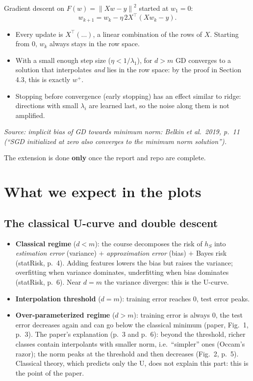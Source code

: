 \documentclass[11pt,a4paper]{article}
\newcommand{\norm}[1]{\left\lVert #1 \right\rVert}
\newcommand{\fonte}[1]{\par\noindent\textit{Source: #1}\par\smallskip}
\begin{document}
Gradient descent on $F(w) = \norm{Xw - y}^2$ started at $w_1 = 0$:
\[
  w_{k+1} = w_k - \eta\, 2X^\top(Xw_k - y).
\]
\begin{itemize}
  \item Every update is $X^\top(\dots)$, a linear combination of the rows of $X$. Starting from $0$, $w_k$ always stays
        in the row space.
  \item With a small enough step size ($\eta < 1/\lambda_1$), for $d > m$ GD converges to a solution that interpolates
        \emph{and} lies in the row space: by the proof in Section 4.3, this is exactly $w^{+}$.
  \item Stopping before convergence (early stopping) has an effect similar to ridge: directions with small $\lambda_i$
        are learned last, so the noise along them is not amplified.
\end{itemize}
\fonte{implicit bias of GD towards minimum norm: Belkin et al.\ 2019, p.~11 (``SGD initialized at zero also converges to the minimum norm solution'').}
The extension is done \textbf{only} once the report and repo are complete.

\section{What we expect in the plots}

\subsection{The classical U-curve and double descent}
\begin{itemize}
  \item \textbf{Classical regime} ($d < m$): the course decomposes the risk of $h_S$ into
        \emph{estimation error} (variance) $+$ \emph{approximation error} (bias) $+$ Bayes risk (statRisk, p.~4).
        Adding features lowers the bias but raises the variance; overfitting when variance dominates, underfitting when
        bias dominates (statRisk, p.~6). Near $d = m$ the variance diverges: this is the U-curve.
  \item \textbf{Interpolation threshold} ($d = m$): training error reaches $0$, test error peaks.
  \item \textbf{Over-parameterized regime} ($d > m$): training error is always $0$, the test error decreases again and
        can go below the classical minimum (paper, Fig.~1, p.~3). The paper's explanation (p.~3 and p.~6): beyond the threshold, richer classes contain interpolants with smaller norm, i.e.\ ``simpler'' ones (Occam's razor); the norm peaks at the threshold and then decreases (Fig.~2, p.~5). Classical theory, which predicts only the U, does not
        explain this part: this is the point of the paper.
\end{itemize}
\end{document}
